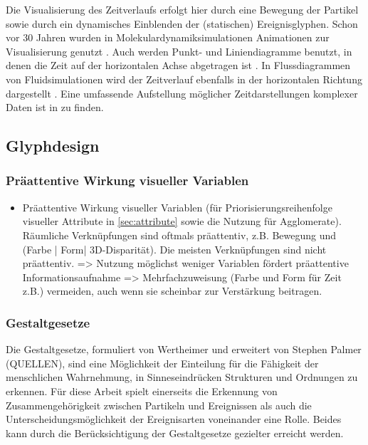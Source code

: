 Die Visualisierung des Zeitverlaufs erfolgt hier durch eine Bewegung der Partikel sowie durch ein dynamisches Einblenden der (statischen) Ereignisglyphen. Schon vor 30 Jahren wurden in Molekulardynamiksimulationen Animationen zur Visualisierung genutzt \cite{delhaise1984computerAnimation}. Auch werden Punkt- und Liniendiagramme benutzt, in denen die Zeit auf der horizontalen Achse abgetragen ist \cite{nerukh2008temporalPatternsMD}. In Flussdiagrammen von Fluidsimulationen wird der Zeitverlauf ebenfalls in der horizontalen Richtung dargestellt \cite{laney2006turbulentMixingLayer}. Eine umfassende Aufstellung möglicher Zeitdarstellungen komplexer Daten ist in \cite{lima2013visualComplexity} zu finden.


\subsection*{Glyphdesign}

\subsubsection*{Präattentive Wirkung visueller Variablen}\label{sec:related-praattentiveWirkung}

\begin{itemize}
	\item Präattentive Wirkung visueller Variablen (für Priorisierungsreihenfolge visueller Attribute in \autoref{sec:attribute} sowie die Nutzung für Agglomerate). Räumliche Verknüpfungen sind oftmals präattentiv, z.B. Bewegung und (Farbe | Form| 3D-Disparität). Die meisten Verknüpfungen sind nicht präattentiv. => Nutzung möglichst weniger Variablen fördert präattentive Informationsaufnahme =>  Mehrfachzuweisung (Farbe und Form für Zeit z.B.) vermeiden, auch wenn sie scheinbar zur Verstärkung beitragen.
\end{itemize}

\subsubsection{Gestaltgesetze}\label{sec:related-gestaltgesetze}
Die Gestaltgesetze, formuliert von Wertheimer und erweitert von Stephen Palmer (QUELLEN), sind eine Möglichkeit der Einteilung für die Fähigkeit der menschlichen Wahrnehmung, in Sinneseindrücken Strukturen und Ordnungen zu erkennen. Für diese Arbeit spielt einerseits die Erkennung von Zusammengehörigkeit zwischen Partikeln und Ereignissen als auch die Unterscheidungsmöglichkeit der Ereignisarten voneinander eine Rolle. Beides kann durch die Berücksichtigung der Gestaltgesetze gezielter erreicht werden.

